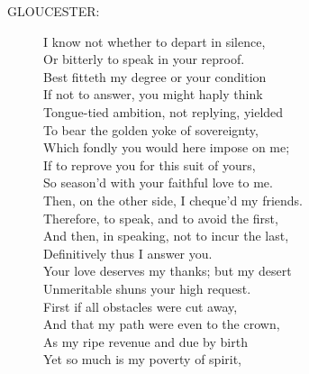 \documentclass{article}
\begin{document}
\begin{description}
\item[GLOUCESTER:] 
\hspace{1pt}I know not whether to depart in silence,\\
\hspace{1pt}Or bitterly to speak in your reproof.\\
\hspace{1pt}Best fitteth my degree or your condition\\
\hspace{1pt}If not to answer, you might haply think\\
\hspace{1pt}Tongue-tied ambition, not replying, yielded\\
\hspace{1pt}To bear the golden yoke of sovereignty,\\
\hspace{1pt}Which fondly you would here impose on me;\\
\hspace{1pt}If to reprove you for this suit of yours,\\
\hspace{1pt}So season'd with your faithful love to me.\\
\hspace{1pt}Then, on the other side, I cheque'd my friends.\\
\hspace{1pt}Therefore, to speak, and to avoid the first,\\
\hspace{1pt}And then, in speaking, not to incur the last,\\
\hspace{1pt}Definitively thus I answer you.\\
\hspace{1pt}Your love deserves my thanks; but my desert\\
\hspace{1pt}Unmeritable shuns your high request.\\
\hspace{1pt}First if all obstacles were cut away,\\
\hspace{1pt}And that my path were even to the crown,\\
\hspace{1pt}As my ripe revenue and due by birth\\
\hspace{1pt}Yet so much is my poverty of spirit,\\

\end{description}
\end{document}

